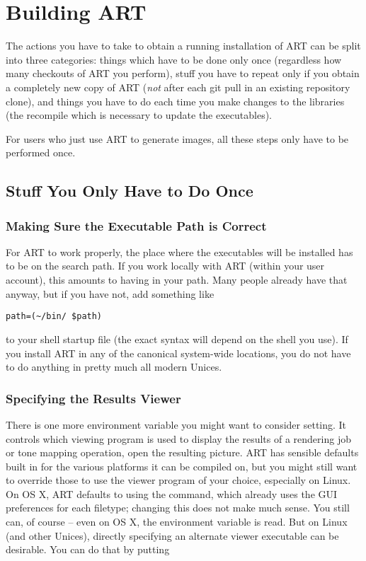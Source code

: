 \chapter{Building ART}
\label{sec:installing}

The actions you have to take to obtain a running installation of ART can be
split into three categories: things which have to be done only once (regardless
how many checkouts of ART you perform), stuff you have to repeat only if you
obtain a completely new copy of ART (\emph{not} after each git pull in an existing repository clone), and
things you have to do each time you make changes to the libraries (the recompile
which is necessary to update the executables).

For users who just use ART to generate images, all these steps only have to be
performed once.

\section{Stuff You Only Have to Do Once}


\subsection{Making Sure the Executable Path is Correct}

For ART to work properly, the place where the executables will be installed has to be on the search path. If you work locally with ART (\ie within your user account), this amounts to having  in your path. Many people already have that anyway, but if you have not, add something like

\begin{verbatim}
path=(~/bin/ $path)
\end{verbatim}

to your shell startup file (the exact syntax will depend on the shell you use). If you install ART in any of the canonical system-wide locations, you do not have to do anything in pretty much all modern Unices.

\subsection{Specifying the Results Viewer}

There is one more environment variable you might want to consider setting. It controls which viewing program is used to display the results of a rendering job or tone mapping operation, \ie open the resulting picture. ART has sensible defaults built in for the various platforms it can be compiled on, but you might still want to override those to use the viewer program of your choice, especially on Linux. On OS X, ART defaults to using the  command, which already uses the GUI preferences for each filetype; changing this does not make much sense. You still can, of course -- even on OS X, the environment variable is read. But on Linux (and other Unices), directly specifying an alternate viewer executable can be desirable. You can do that by putting

